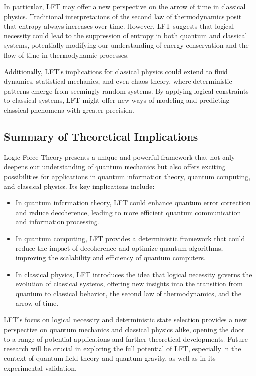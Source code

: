 In particular, LFT may offer a new perspective on the arrow of time in classical physics. Traditional interpretations of the second law of thermodynamics posit that entropy always increases over time. However, LFT suggests that logical necessity could lead to the suppression of entropy in both quantum and classical systems, potentially modifying our understanding of energy conservation and the flow of time in thermodynamic processes.

Additionally, LFT’s implications for classical physics could extend to fluid dynamics, statistical mechanics, and even chaos theory, where deterministic patterns emerge from seemingly random systems. By applying logical constraints to classical systems, LFT might offer new ways of modeling and predicting classical phenomena with greater precision.

\subsection{Summary of Theoretical Implications}
Logic Force Theory presents a unique and powerful framework that not only deepens our understanding of quantum mechanics but also offers exciting possibilities for applications in quantum information theory, quantum computing, and classical physics. Its key implications include:
\begin{itemize}
    \item In quantum information theory, LFT could enhance quantum error correction and reduce decoherence, leading to more efficient quantum communication and information processing.
    \item In quantum computing, LFT provides a deterministic framework that could reduce the impact of decoherence and optimize quantum algorithms, improving the scalability and efficiency of quantum computers.
    \item In classical physics, LFT introduces the idea that logical necessity governs the evolution of classical systems, offering new insights into the transition from quantum to classical behavior, the second law of thermodynamics, and the arrow of time.
\end{itemize}

LFT’s focus on logical necessity and deterministic state selection provides a new perspective on quantum mechanics and classical physics alike, opening the door to a range of potential applications and further theoretical developments. Future research will be crucial in exploring the full potential of LFT, especially in the context of quantum field theory and quantum gravity, as well as in its experimental validation.